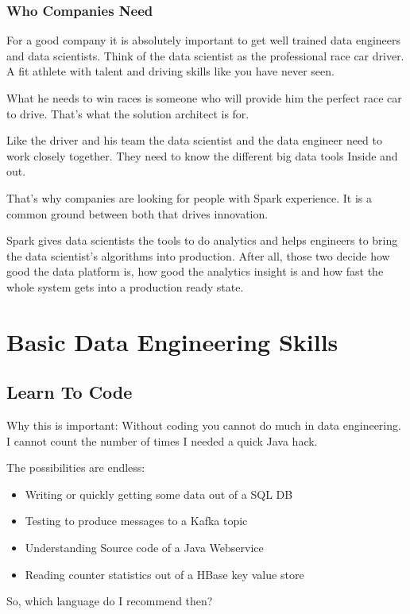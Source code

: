 \documentclass[12pt, numbers=noenddot]{scrreprt} %
\begin{document}
\section{Who Companies Need}
For a good company it is absolutely important to get well trained data engineers and data scientists. Think of the data scientist as the professional race car driver. A fit athlete with talent and driving skills like you have never seen.

What he needs to win races is someone who will provide him the perfect race car to drive. That’s what the solution architect is for.

Like the driver and his team the data scientist and the data engineer need to work closely together. They need to know the different big data tools Inside and out.

That's why companies are looking for people with Spark experience. It is a common ground between both that drives innovation.

Spark gives data scientists the tools to do analytics and helps engineers to bring the data scientist’s algorithms into production. After all, those two decide how good the data platform is, how good the analytics insight is and how fast the whole system gets into a production ready state.

\part{Basic Data Engineering Skills}

\chapter{Learn To Code}

Why this is important: Without coding you cannot do much in data engineering. I cannot count the number of times I needed a quick Java hack.

The possibilities are endless:

\begin{itemize}
\item Writing or quickly getting some data out of a SQL DB
\item Testing to produce messages to a Kafka topic
\item Understanding Source code of a Java Webservice
\item Reading counter statistics out of a HBase key value store
\end{itemize}
So, which language do I recommend then?
\end{document}
